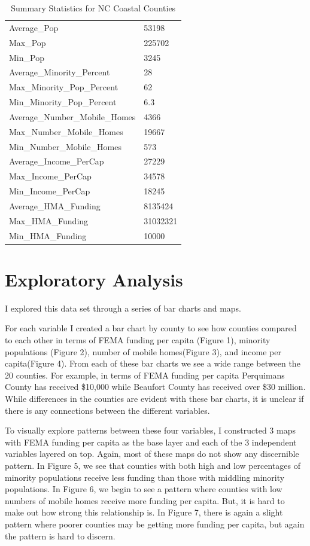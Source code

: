 \documentclass[
  12pt,
]{article}
\begin{document}
\begin{longtable}[]{@{}ll@{}}
\caption{Summary Statistics for NC Coastal Counties}\tabularnewline
\toprule
\endhead
Average\_Pop & 53198 \\
Max\_Pop & 225702 \\
Min\_Pop & 3245 \\
Average\_Minority\_Percent & 28 \\
Max\_Minority\_Pop\_Percent & 62 \\
Min\_Minority\_Pop\_Percent & 6.3 \\
Average\_Number\_Mobile\_Homes & 4366 \\
Max\_Number\_Mobile\_Homes & 19667 \\
Min\_Number\_Mobile\_Homes & 573 \\
Average\_Income\_PerCap & 27229 \\
Max\_Income\_PerCap & 34578 \\
Min\_Income\_PerCap & 18245 \\
Average\_HMA\_Funding & 8135424 \\
Max\_HMA\_Funding & 31032321 \\
Min\_HMA\_Funding & 10000 \\
\bottomrule
\end{longtable}

\newpage

\hypertarget{exploratory-analysis}{%
\section{Exploratory Analysis}\label{exploratory-analysis}}

I explored this data set through a series of bar charts and maps.

For each variable I created a bar chart by county to see how counties
compared to each other in terms of FEMA funding per capita (Figure 1),
minority populations (Figure 2), number of mobile homes(Figure 3), and
income per capita(Figure 4). From each of these bar charts we see a wide
range between the 20 counties. For example, in terms of FEMA funding per
capita Perquimans County has received \$10,000 while Beaufort County has
received over \$30 million. While differences in the counties are
evident with these bar charts, it is unclear if there is any connections
between the different variables.

To visually explore patterns between these four variables, I constructed
3 maps with FEMA funding per capita as the base layer and each of the 3
independent variables layered on top. Again, most of these maps do not
show any discernible pattern. In Figure 5, we see that counties with
both high and low percentages of minority populations receive less
funding than those with middling minority populations. In Figure 6, we
begin to see a pattern where counties with low numbers of mobile homes
receive more funding per capita. But, it is hard to make out how strong
this relationship is. In Figure 7, there is again a slight pattern where
poorer counties may be getting more funding per capita, but again the
pattern is hard to discern.
\end{document}
